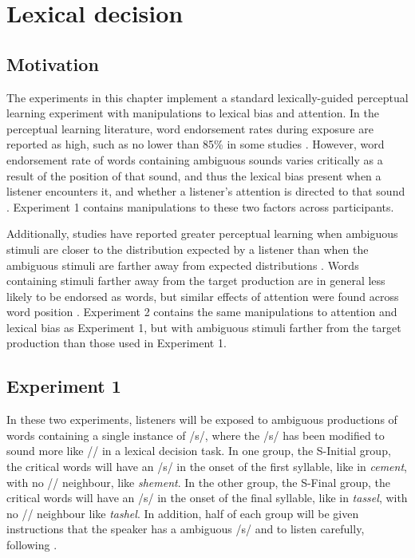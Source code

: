 
\chapter{Lexical decision}
\label{chap:lexdec}


\section{Motivation}

The experiments in this chapter implement a standard lexically-guided perceptual learning experiment with manipulations to lexical bias and attention.  
In the perceptual learning literature, word endorsement rates during exposure are reported as high, such as no lower than 85\% in some studies \citep{Reinisch2013}. 
However, word endorsement rate of words containing ambiguous sounds varies critically as a result of the position of that sound, and thus the lexical bias present when a listener encounters it, and whether a listener's attention is directed to that sound \citep{Pitt2012}.  
Experiment 1 contains manipulations to these two factors across participants.

Additionally, studies have reported greater perceptual learning when ambiguous stimuli are closer to the distribution expected by a listener than when the ambiguous stimuli are farther away from expected distributions \citep{Sumner2011}.  
Words containing stimuli farther away from the target production are in general less likely to be endorsed as words, but similar effects of attention were found across word position \citep{Pitt2012}.  
Experiment 2 contains the same manipulations to attention and lexical bias as Experiment 1, but with ambiguous stimuli farther from the target production than those used in Experiment 1.

\section{Experiment 1}

In these two experiments, listeners will be exposed to ambiguous productions of words containing a single instance of /s/, where the /s/ has been modified to sound more like /\textesh/ in a lexical decision task. 
In one group, the S-Initial group, the critical words will have an /s/ in the onset of the first syllable, like in \emph{cement}, with no /\textesh/ neighbour, like \emph{shement}.  
In the other group, the S-Final group, the critical words will have an /s/ in the onset of the final syllable, like in \emph{tassel}, with no /\textesh/ neighbour like \emph{tashel}.  
In addition, half of each group will be given instructions that the speaker has a ambiguous /s/ and to listen carefully, following \citet{Pitt2012}.

